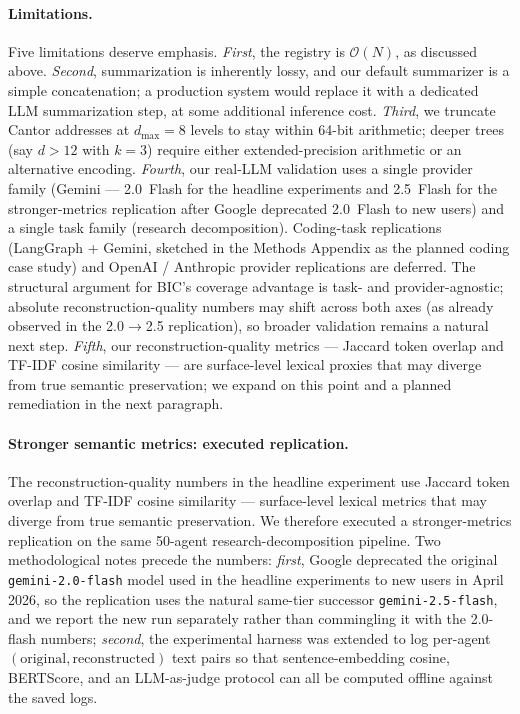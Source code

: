 \documentclass[fleqn,10pt]{article}
\theoremstyle{definition}
\newcommand{\Oh}{\mathcal{O}}
\begin{document}
\paragraph{Limitations.}
Five limitations deserve emphasis.
\emph{First}, the registry is $\Oh(N)$, as discussed above.
\emph{Second}, summarization is inherently lossy, and our default
summarizer is a simple concatenation; a production system would
replace it with a dedicated LLM summarization step, at some additional
inference cost.
\emph{Third}, we truncate Cantor addresses at $d_{\max}{=}8$ levels
to stay within 64-bit arithmetic; deeper trees (say $d{>}12$ with
$k{=}3$) require either extended-precision arithmetic or an
alternative encoding.
\emph{Fourth}, our real-LLM validation uses a single provider family
(Gemini --- 2.0~Flash for the headline experiments and 2.5~Flash for
the stronger-metrics replication after Google deprecated 2.0~Flash to
new users) and a single task family (research decomposition).
Coding-task replications (LangGraph + Gemini, sketched in the Methods
Appendix as the planned coding case study) and OpenAI / Anthropic
provider replications are deferred. The structural argument for BIC's
coverage advantage is task- and provider-agnostic; absolute
reconstruction-quality numbers may shift across both axes (as already
observed in the 2.0$\to$2.5 replication), so broader validation
remains a natural next step.
\emph{Fifth}, our reconstruction-quality metrics --- Jaccard token
overlap and TF-IDF cosine similarity --- are surface-level lexical
proxies that may diverge from true semantic preservation; we expand
on this point and a planned remediation in the next paragraph.

\paragraph{Stronger semantic metrics: executed replication.}
The reconstruction-quality numbers in the headline experiment use
Jaccard token overlap and TF-IDF cosine similarity --- surface-level
lexical metrics that may diverge from true semantic preservation.
We therefore executed a stronger-metrics replication on the same
50-agent research-decomposition pipeline. Two methodological notes
precede the numbers: \emph{first}, Google deprecated the original
\texttt{gemini-2.0-flash} model used in the headline experiments to
new users in April 2026, so the replication uses the natural same-tier
successor \texttt{gemini-2.5-flash}, and we report the new run
separately rather than commingling it with the 2.0-flash numbers;
\emph{second}, the experimental harness was extended to log per-agent
$(\text{original}, \text{reconstructed})$ text pairs so that
sentence-embedding cosine, BERTScore, and an LLM-as-judge protocol
can all be computed offline against the saved logs.
\end{document}

